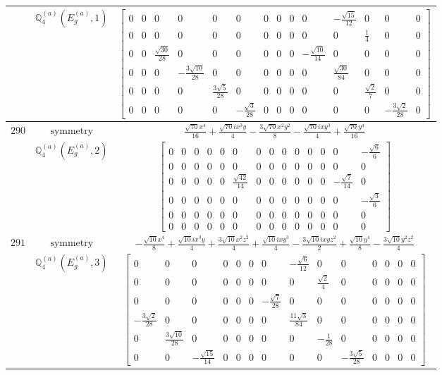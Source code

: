 \documentclass[fleqn,8pt,landscape]{jsarticle}
\begin{document}
\begin{longtable}{ccc}
$  $ & $ \mathbb{Q}_{4}^{(a)}(E_{g}^{(a)},1) $ & $ \begin{bmatrix} 0 & 0 & 0 & 0 & 0 & 0 & 0 & 0 & 0 & 0 & - \frac{\sqrt{15}}{12} & 0 & 0 & 0 \\ 0 & 0 & 0 & 0 & 0 & 0 & 0 & 0 & 0 & 0 & 0 & \frac{1}{4} & 0 & 0 \\ 0 & 0 & \frac{\sqrt{30}}{28} & 0 & 0 & 0 & 0 & 0 & 0 & - \frac{\sqrt{10}}{14} & 0 & 0 & 0 & 0 \\ 0 & 0 & 0 & - \frac{3 \sqrt{10}}{28} & 0 & 0 & 0 & 0 & 0 & 0 & \frac{\sqrt{30}}{84} & 0 & 0 & 0 \\ 0 & 0 & 0 & 0 & \frac{3 \sqrt{5}}{28} & 0 & 0 & 0 & 0 & 0 & 0 & \frac{\sqrt{2}}{7} & 0 & 0 \\ 0 & 0 & 0 & 0 & 0 & - \frac{\sqrt{3}}{28} & 0 & 0 & 0 & 0 & 0 & 0 & - \frac{3 \sqrt{2}}{28} & 0 \end{bmatrix} $ \\ \hline
$ 290 $ & $ \text{symmetry} $ & $ \frac{\sqrt{70} x^{4}}{16} + \frac{\sqrt{70} i x^{3} y}{4} - \frac{3 \sqrt{70} x^{2} y^{2}}{8} - \frac{\sqrt{70} i x y^{3}}{4} + \frac{\sqrt{70} y^{4}}{16} $ \\
$  $ & $ \mathbb{Q}_{4}^{(a)}(E_{g}^{(a)},2) $ & $ \begin{bmatrix} 0 & 0 & 0 & 0 & 0 & 0 & 0 & 0 & 0 & 0 & 0 & 0 & 0 & - \frac{\sqrt{6}}{6} \\ 0 & 0 & 0 & 0 & 0 & 0 & 0 & 0 & 0 & 0 & 0 & 0 & 0 & 0 \\ 0 & 0 & 0 & 0 & 0 & \frac{\sqrt{42}}{14} & 0 & 0 & 0 & 0 & 0 & 0 & - \frac{\sqrt{7}}{14} & 0 \\ 0 & 0 & 0 & 0 & 0 & 0 & 0 & 0 & 0 & 0 & 0 & 0 & 0 & - \frac{\sqrt{3}}{6} \\ 0 & 0 & 0 & 0 & 0 & 0 & 0 & 0 & 0 & 0 & 0 & 0 & 0 & 0 \\ 0 & 0 & 0 & 0 & 0 & 0 & 0 & 0 & 0 & 0 & 0 & 0 & 0 & 0 \end{bmatrix} $ \\ \hline
$ 291 $ & $ \text{symmetry} $ & $ - \frac{\sqrt{10} x^{4}}{8} + \frac{\sqrt{10} i x^{3} y}{4} + \frac{3 \sqrt{10} x^{2} z^{2}}{4} + \frac{\sqrt{10} i x y^{3}}{4} - \frac{3 \sqrt{10} i x y z^{2}}{2} + \frac{\sqrt{10} y^{4}}{8} - \frac{3 \sqrt{10} y^{2} z^{2}}{4} $ \\
$  $ & $ \mathbb{Q}_{4}^{(a)}(E_{g}^{(a)},3) $ & $ \begin{bmatrix} 0 & 0 & 0 & 0 & 0 & 0 & 0 & - \frac{\sqrt{6}}{12} & 0 & 0 & 0 & 0 & 0 & 0 \\ 0 & 0 & 0 & 0 & 0 & 0 & 0 & 0 & \frac{\sqrt{2}}{4} & 0 & 0 & 0 & 0 & 0 \\ 0 & 0 & 0 & 0 & 0 & 0 & - \frac{\sqrt{7}}{28} & 0 & 0 & 0 & 0 & 0 & 0 & 0 \\ - \frac{3 \sqrt{2}}{28} & 0 & 0 & 0 & 0 & 0 & 0 & \frac{11 \sqrt{3}}{84} & 0 & 0 & 0 & 0 & 0 & 0 \\ 0 & \frac{3 \sqrt{10}}{28} & 0 & 0 & 0 & 0 & 0 & 0 & - \frac{1}{28} & 0 & 0 & 0 & 0 & 0 \\ 0 & 0 & - \frac{\sqrt{15}}{14} & 0 & 0 & 0 & 0 & 0 & 0 & - \frac{3 \sqrt{5}}{28} & 0 & 0 & 0 & 0 \end{bmatrix} $ \\ \hline

\end{longtable}
\end{document}
